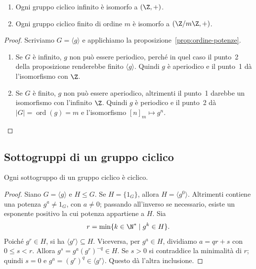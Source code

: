 \begin{teorema}\label{teo:classificazione-ciclici}
\begin{enumerate}[label=\arabic*.]
\item Ogni gruppo ciclico infinito è isomorfo a $(\Z,+)$.
\item Ogni gruppo ciclico finito di ordine $m$ è isomorfo a $(\Z/m\Z,+)$.
\end{enumerate}
\end{teorema}
\begin{proof}
Scriviamo $G=\langle g\rangle$ e applichiamo la proposizione~\ref{prop:ordine-potenze}.
\begin{enumerate}[label=\arabic*.]
\item Se $G$ è infinito, $g$ non può essere periodico, perché in quel caso il punto~2 della proposizione renderebbe finito $\langle g\rangle$. Quindi $g$ è aperiodico e il punto~1 dà l'isomorfismo con $\Z$.
\item Se $G$ è finito, $g$ non può essere aperiodico, altrimenti il punto~1 darebbe un isomorfismo con l'infinito $\Z$. Quindi $g$ è periodico e il punto~2 dà $|G|=\operatorname{ord}(g)=m$ e l'isomorfismo $[n]_m\mapsto g^n$.
\end{enumerate}
\end{proof}

\subsection{Sottogruppi di un gruppo ciclico}
\begin{teorema}\label{teo:sottogruppi-ciclici}
Ogni sottogruppo di un gruppo ciclico è ciclico.
\end{teorema}
\begin{proof}
Siano $G=\langle g\rangle$ e $H\le G$. Se $H=\{1_G\}$, allora $H=\langle g^0\rangle$. Altrimenti contiene una potenza $g^a\ne1_G$, con $a\ne0$; passando all'inverso se necessario, esiste un esponente positivo la cui potenza appartiene a $H$. Sia
\[
r=\min\{k\in\N^*\mid g^k\in H\}.
\]
Poiché $g^r\in H$, si ha $\langle g^r\rangle\subseteq H$. Viceversa, per $g^a\in H$, dividiamo $a=qr+s$ con $0\le s<r$. Allora $g^s=g^a(g^r)^{-q}\in H$. Se $s>0$ si contraddice la minimalità di $r$; quindi $s=0$ e $g^a=(g^r)^q\in\langle g^r\rangle$. Questo dà l'altra inclusione.
\end{proof}

